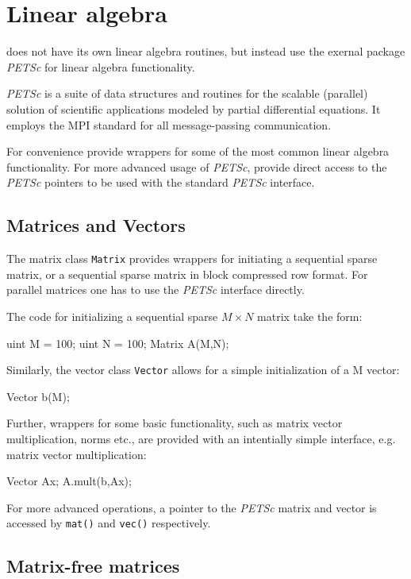 \chapter{Linear algebra}

\dolfin{} does not have its own linear algebra routines, 
but instead use the exernal package {\em PETSc} \cite{www:petsc} 
for linear algebra functionality.    

{\em PETSc} is a suite of data structures and routines for the scalable 
(parallel) solution of scientific applications modeled by partial 
differential equations. 
It employs the MPI standard for all message-passing communication.  

For convenience \dolfin{} provide wrappers for some of the most 
common linear algebra functionality. For more advanced usage of 
{\em PETSc}, \dolfin{} provide direct access to the {\em PETSc} pointers 
to be used with the standard {\em PETSc} interface. 

\section{Matrices and Vectors}

The matrix class \texttt{Matrix} provides wrappers for initiating a 
sequential sparse matrix, or a sequential sparse matrix in 
block compressed row format. For parallel matrices one has to use 
the {\em PETSc} interface directly. 

The code for initializing a sequential sparse $M\times N$ matrix 
take the form: 
\begin{code}
uint M = 100; 
uint N = 100; 
Matrix A(M,N);
\end{code}

Similarly, the vector class \texttt{Vector} allows for a simple 
initialization of a M vector:  
\begin{code}
Vector b(M);
\end{code}

Further, wrappers for some basic functionality, such as matrix vector 
multiplication, norms etc., are provided with an intentially simple interface, 
e.g. matrix vector multiplication: 
\begin{code}
Vector Ax;
A.mult(b,Ax);
\end{code} 

For more advanced operations, a pointer to the {\em PETSc} matrix and vector is 
accessed by \texttt{mat()} and \texttt{vec()} respectively. 

\section{Matrix-free matrices}

